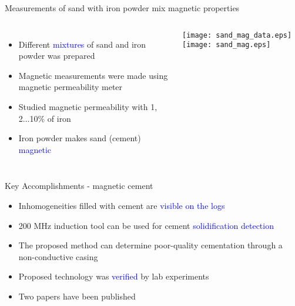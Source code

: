 \documentclass[aspectratio=169]{beamer}
\begin{document}
\begin{frame}{Measurements of sand with iron powder mix magnetic properties}


 \begin{columns}[c] 


    
\begin{itemize}
\item Different \textcolor{blue} {mixtures} of sand and iron powder was prepared
\item Magnetic measurements were made using magnetic permeability meter 
\item Studied magnetic permeability with 1, 2...10\% of iron
\item Iron powder makes sand (cement) \textcolor{blue}{magnetic}
\end{itemize}


\texttt{[image: sand\_mag\_data.eps]}
\texttt{[image: sand\_mag.eps]}

\end{columns}



\end{frame}

\begin{frame}{Key Accomplishments - magnetic cement}

\begin{Large}
\begin{itemize}

\item Inhomogeneities filled with cement are \textcolor{blue} {visible on the logs}
\item 200 MHz induction tool can be used for cement \textcolor{blue} {solidification detection}
\item The proposed method can determine poor-quality cementation through a non-conductive casing
\item Proposed technology was \textcolor{blue} {verified} by lab experiments
\item Two papers have been published

\end{itemize}
\end{Large}


\end{frame}


%
%
\end{document}
